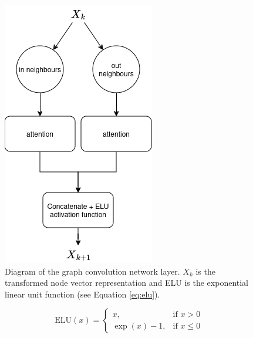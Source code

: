 \begin{figure}
    \centering
    \includegraphics[width=0.5\linewidth]{images/gcn_update_aggregate_diagram.png}
    \caption{Diagram of the graph convolution network layer. $X_k$ is the transformed node vector representation
    and ELU is the exponential linear unit function (see Equation \ref{eq:elu}).}
    \label{fig:update_aggregate_diagram}
\end{figure}

\begin{equation}
\text{ELU}(x) = 
\begin{cases}
x, & \text{if } x > 0 \\
\exp(x) - 1, & \text{if } x \leq 0
\end{cases}
\label{eq:elu}
\end{equation}